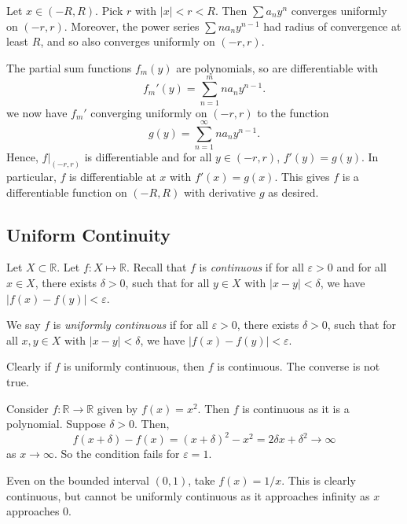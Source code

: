 \documentclass[12pt]{article}
\begin{document}
\begin{proofbox}
	Let $x \in (-R, R)$. Pick $r$ with $|x| < r < R$. Then $\sum a_n y^{n}$ converges uniformly on $(-r, r)$. Moreover, the power series $\sum n a_n y^{n-1}$ had radius of convergence at least $R$, and so also converges uniformly on $(-r, r)$.

	The partial sum functions $f_m(y)$ are polynomials, so are differentiable with
	\[
		f_m'(y) = \sum_{n = 1}^{m} n a_n y^{n-1}
	.\]
	we now have $f_m'$ converging uniformly on $(-r, r)$ to the function
	\[
		g(y) = \sum_{n = 1}^{\infty}n a_n y^{n-1}
	.\]
	Hence, $f|_{(-r, r)}$ is differentiable and for all $y \in (-r, r)$, $f'(y) = g(y)$. In particular, $f$ is differentiable at $x$ with $f'(x) = g(x)$. This gives $f$ is a differentiable function on $(-R, R)$ with derivative $g$ as desired.
\end{proofbox}

\subsection{Uniform Continuity}%
\label{sub:uniform_continuity}

Let $X \subset \mathbb{R}$. Let $f : X \mapsto \mathbb{R}$. Recall that $f$ is \textit{continuous} if for all $\varepsilon > 0$ and for all $x \in X$, there exists $\delta > 0$, such that for all $y \in X$ with $|x - y| < \delta$, we have $|f(x) - f(y)| < \varepsilon$.

\begin{definition}
	We say $f$ is \textit{uniformly continuous} if for all $\varepsilon > 0$, there exists $\delta > 0$, such that for all $x, y \in X$ with $|x - y| < \delta$, we have $|f(x) - f(y)| < \varepsilon$.
\end{definition}

\begin{remark}
	Clearly if $f$ is uniformly continuous, then $f$ is continuous. The converse is not true.
\end{remark}

\begin{exbox}
	Consider $f : \mathbb{R} \to \mathbb{R}$ given by $f(x) = x^2$. Then $f$ is continuous as it is a polynomial. Suppose $\delta > 0$. Then,
	\[
		f(x + \delta) - f(x) = (x + \delta)^2 - x^2 = 2 \delta x + \delta^2 \to \infty
	\]
	as $x \to \infty$. So the condition fails for $\varepsilon = 1$.

	Even on the bounded interval $(0, 1)$, take $f(x) = 1/x$. This is clearly continuous, but cannot be uniformly continuous as it approaches infinity as $x$ approaches 0.
\end{exbox}
\end{document}
